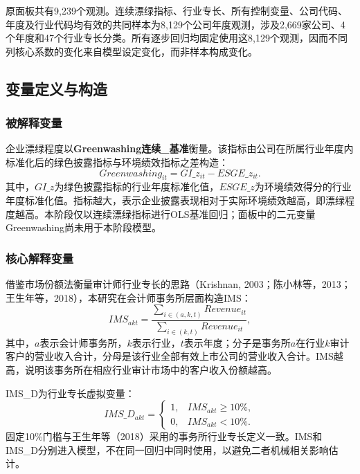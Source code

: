 \documentclass[UTF8,12pt,a4paper]{ctexart}
\begin{document}
原面板共有9,239个观测。连续漂绿指标、行业专长、所有控制变量、公司代码、年度及行业代码均有效的共同样本为8,129个公司年度观测，涉及2,669家公司、4个年度和47个行业专长分类。所有逐步回归均固定使用这8,129个观测，因而不同列核心系数的变化来自模型设定变化，而非样本构成变化。

\subsection{变量定义与构造}

\subsubsection{被解释变量}

企业漂绿程度以\textbf{Greenwashing连续\_基准}衡量。该指标由公司在所属行业年度内标准化后的绿色披露指标与环境绩效指标之差构造：
\begin{equation}
Greenwashing_{it}=GI\_z_{it}-ESGE\_z_{it}.
\end{equation}
其中，$GI\_z$为绿色披露指标的行业年度标准化值，$ESGE\_z$为环境绩效得分的行业年度标准化值。指标越大，表示企业披露表现相对于实际环境绩效越高，即漂绿程度越高。本阶段仅以连续漂绿指标进行OLS基准回归；面板中的二元变量Greenwashing尚未用于本阶段模型。

\subsubsection{核心解释变量}

借鉴市场份额法衡量审计师行业专长的思路（Krishnan, 2003；陈小林等，2013；王生年等，2018），本研究在会计师事务所层面构造IMS：
\begin{equation}
IMS_{akt}=\frac{\sum_{i\in(a,k,t)}Revenue_{it}}
{\sum_{i\in(k,t)}Revenue_{it}},
\end{equation}
其中，$a$表示会计师事务所，$k$表示行业，$t$表示年度；分子是事务所$a$在行业$k$审计客户的营业收入合计，分母是该行业全部有效上市公司的营业收入合计。IMS越高，说明该事务所在相应行业审计市场中的客户收入份额越高。

IMS\_D为行业专长虚拟变量：
\begin{equation}
IMS\_D_{akt}=\begin{cases}
1,& IMS_{akt}\geq 10\%,\\
0,& IMS_{akt}<10\%.
\end{cases}
\end{equation}
固定10\%门槛与王生年等（2018）采用的事务所行业专长定义一致。IMS和IMS\_D分别进入模型，不在同一回归中同时使用，以避免二者机械相关影响估计。
\end{document}

